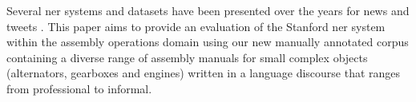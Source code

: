 Several \gls{ner} systems and datasets have been presented over the years for news and tweets \cite{Dojchinovski2013}. This paper aims to provide an evaluation of the Stanford \gls{ner} system within the assembly operations domain using our new manually annotated corpus containing a diverse range of assembly manuals for small complex objects (alternators, gearboxes and engines) written in a language discourse that ranges from professional to informal.
